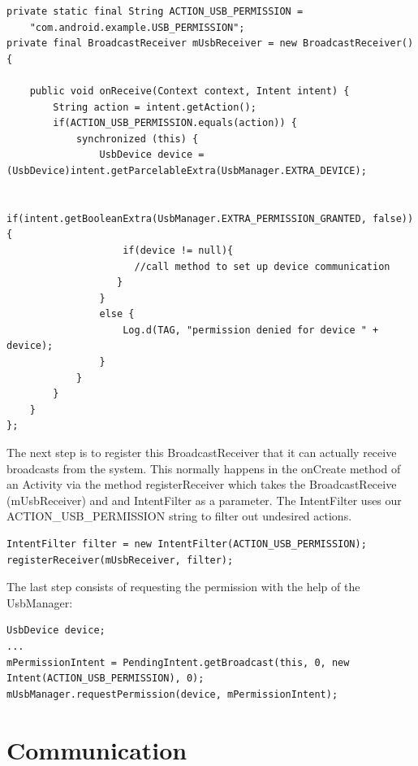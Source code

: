 \begin{lstlisting}[caption=Permission BroadcastReceiver \cite{android_usb_host}, label=listing:permission_broadcast]
private static final String ACTION_USB_PERMISSION =
    "com.android.example.USB_PERMISSION";
private final BroadcastReceiver mUsbReceiver = new BroadcastReceiver() {

    public void onReceive(Context context, Intent intent) {
        String action = intent.getAction();
        if(ACTION_USB_PERMISSION.equals(action)) {
            synchronized (this) {
                UsbDevice device = (UsbDevice)intent.getParcelableExtra(UsbManager.EXTRA_DEVICE);

                if(intent.getBooleanExtra(UsbManager.EXTRA_PERMISSION_GRANTED, false)) {
                    if(device != null){
                      //call method to set up device communication
                   }
                } 
                else {
                    Log.d(TAG, "permission denied for device " + device);
                }
            }
        }
    }
};
\end{lstlisting}

The next step is to register this BroadcastReceiver that it can actually receive broadcasts from the system. This normally happens in the onCreate method of an Activity via the method registerReceiver which takes the BroadcastReceive (mUsbReceiver) and and IntentFilter as a parameter. The IntentFilter uses our ACTION\_USB\_PERMISSION string to filter out undesired actions.

\begin{lstlisting}[caption=Register the BroadcastReceiver \cite{android_usb_host}, label=listing:register_broadcast]
IntentFilter filter = new IntentFilter(ACTION_USB_PERMISSION);
registerReceiver(mUsbReceiver, filter);
\end{lstlisting}

The last step consists of requesting the permission with the help of the UsbManager:

\begin{lstlisting}[caption=Register the BroadcastReceiver \cite{android_usb_host}, label=listing:request_permission]
UsbDevice device;
...
mPermissionIntent = PendingIntent.getBroadcast(this, 0, new Intent(ACTION_USB_PERMISSION), 0);
mUsbManager.requestPermission(device, mPermissionIntent);
\end{lstlisting}

\section{Communication}

